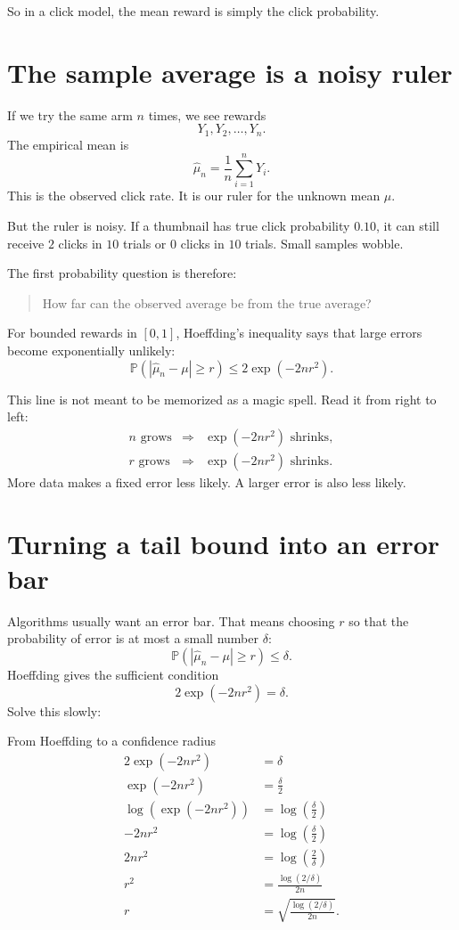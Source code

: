 \documentclass[en,nofont,11pt]{elegantbook}
\newcommand{\Pp}{\mathbb{P}}
\begin{document}
So in a click model, the mean reward is simply the click probability.

\section{The sample average is a noisy ruler}

If we try the same arm $n$ times, we see rewards
\[
Y_1,Y_2,\ldots,Y_n.
\]
The empirical mean is
\[
\widehat\mu_n=\frac{1}{n}\sum_{i=1}^n Y_i.
\]
This is the observed click rate. It is our ruler for the unknown mean $\mu$.

But the ruler is noisy. If a thumbnail has true click probability $0.10$, it can still receive $2$ clicks in $10$ trials or $0$ clicks in $10$ trials. Small samples wobble.

The first probability question is therefore:

\begin{quote}
How far can the observed average be from the true average?
\end{quote}

For bounded rewards in $[0,1]$, Hoeffding's inequality says that large errors become exponentially unlikely:
\[
\Pp\left(\left|\widehat\mu_n-\mu\right|\geq r\right)
\leq
2\exp(-2nr^2).
\]

This line is not meant to be memorized as a magic spell. Read it from right to left:
\[
\begin{array}{ccl}
 n \text{ grows} &\Longrightarrow& \exp(-2nr^2) \text{ shrinks},\\
 r \text{ grows} &\Longrightarrow& \exp(-2nr^2) \text{ shrinks}.
\end{array}
\]
More data makes a fixed error less likely. A larger error is also less likely.

\section{Turning a tail bound into an error bar}

Algorithms usually want an error bar. That means choosing $r$ so that the probability of error is at most a small number $\delta$:
\[
\Pp\left(\left|\widehat\mu_n-\mu\right|\geq r\right)
\leq \delta.
\]
Hoeffding gives the sufficient condition
\[
2\exp(-2nr^2)=\delta.
\]
Solve this slowly:

\begin{derivationbox}{From Hoeffding to a confidence radius}
\[
\begin{aligned}
2\exp(-2nr^2)&=\delta\\
\exp(-2nr^2)&=\frac{\delta}{2}\\
\log\left(\exp(-2nr^2)\right)&=\log\left(\frac{\delta}{2}\right)\\
-2nr^2&=\log\left(\frac{\delta}{2}\right)\\
2nr^2&=\log\left(\frac{2}{\delta}\right)\\
r^2&=\frac{\log(2/\delta)}{2n}\\
r&=\sqrt{\frac{\log(2/\delta)}{2n}}.
\end{aligned}
\]
\end{derivationbox}
\end{document}
